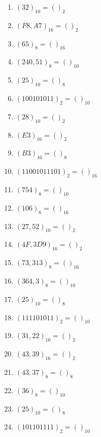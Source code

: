\documentclass[11pt]{article}
\begin{document}
\begin{enumerate}
\item \((32)_{10} = ( )_{2}\)

\item \((F8,A7)_{16} = ( )_{2}\)

\item \((65)_{8} = ( )_{16}\)

\item \((240,51)_{8} = ( )_{10}\)

\item \((25)_{10} = ( )_{8}\)

\item \((100101011)_{2} = ( )_{10}\)

\item \((28)_{10} = ( )_{2}\)

\item \((E3)_{16} = ( )_{2}\)

\item \((B3)_{16} = ( )_{8}\)

\item \((11001011101)_{2} = ( )_{16}\)

\item \((754)_{8} = ( )_{10}\)

\item \((106)_{8} = ( )_{16}\)

\item \((27,52)_{10} = ( )_{2}\)

\item \((4F,3D9)_{16} = ( )_{2}\)

\item \((73,313)_{8} = ( )_{16}\)

\item \((364,3)_{8} = ( )_{10}\)

\item \((25)_{10} = ( )_{8}\)

\item \((111101011)_{2} = ( )_{10}\)

\item \((31,22)_{10} = ( )_{2}\)

\item \((43,39)_{16} = ( )_{2}\)

\item \((43,37)_{8} = ( )_{8}\)

\item \((36)_{8} = ( )_{10}\)

\item \((25)_{10} = ( )_{8}\)

\item \((101101111)_{2} = ( )_{10}\)
\end{enumerate}
\end{document}
